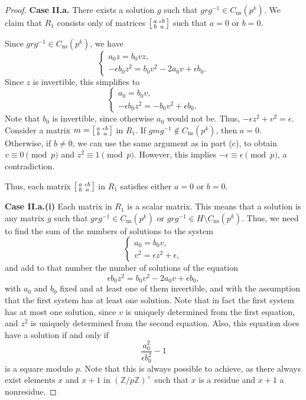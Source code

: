 \documentclass[10pt,leqno]{amsart}
\newcommand\sm[1]{\begin{bsmallmatrix}#1\end{bsmallmatrix}}
\newcommand{\Z}{\mathbb{Z}}
\theoremstyle{definition}
\theoremstyle{remark}
\numberwithin{theorem}{section}
\begin{document}
\begin{proof}
\noindent \textbf{Case II.a.} There exists a solution $g$ such that $grg^{-1}\in C_{\mathrm{ns}}(p^k)$. We claim that $R_1$ consists only of matrices $\sm{a & \epsilon b \\ b & a}$ such that $a=0$ or $b=0$.


 Since $grg^{-1} \in C_{\mathrm{ns}}(p^k)$, we have $$\begin{cases}
    a_0z=b_0vz, \\
    -\epsilon b_0z^2=b_0v^2-2a_0v+\epsilon b_0.
\end{cases}    
$$
Since $z$ is invertible, this simplifies to $$\begin{cases}
    a_0=b_0v, \\
    -\epsilon b_0z^2=-b_0v^2+\epsilon b_0.
\end{cases}$$
Note that $b_0$ is invertible, since otherwise $a_0$ would not be. Thus, $-\epsilon z^2+v^2=\epsilon.$
Consider a matrix $m=\sm{a & \epsilon b \\ b & a}$ in $R_1$. If $gmg^{-1}\not \in C_{\mathrm{ns}}(p^k)$, then $a=0$. Otherwise, if $b\neq 0$, we can use the same argument as in part (c), to obtain $v\equiv 0 \pmod p$ and $z^2\equiv 1 \pmod p$. However, this implies $-\epsilon \equiv \epsilon \pmod p$, a contradiction.   

Thus, each matrix $\sm{a &  \epsilon b \\ b & a}$ in $R_1$ satisfies either $a=0$ or $b=0$.

\noindent \textbf{Case II.a.(i)} Each matrix in $R_1$ is a scalar matrix. This means that a solution is any matrix $g$ such that $grg^{-1} \in C_{\mathrm{ns}}(p^k)$ or $grg^{-1} \in H\setminus C_{\mathrm{ns}}(p^k)$. Thus, we need to find the sum of the numbers of solutions to the system $$\begin{cases}
a_0=b_0v, \\
v^2=\epsilon z^2+\epsilon,
\end{cases}$$
and add to that number the number of solutions of the equation\begin{equation} \label{bla2}
    \epsilon b_0 z^2=b_0 v^2-2a_0v+\epsilon b_0,
\end{equation}
with $a_0$ and $b_0$ fixed and at least one of them invertible, and with the assumption that the first system has at least one solution. Note that in fact the first system has at most one solution, since $v$ is uniquely determined from the first equation, and $z^2$ is uniquely determined from the second equation. Also, this equation does have a solution if and only if $$\frac{a_0^2}{\epsilon b_0^2}-1$$ is a square modulo $p$. Note that this is always possible to achieve, as there always exist elements $x$ and $x+1$ in $(\Z/p\Z)^\times$ such that $x$ is a residue and $x+1$ a nonresidue.


\end{proof}
\end{document}
